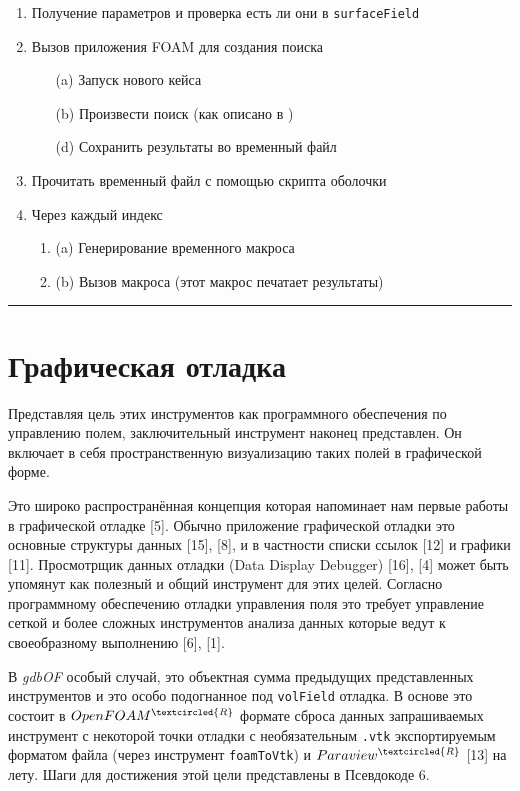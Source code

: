 \documentclass[a4paper,10pt]{book}
\begin{document}
{\begin{enumerate}
        \item Получение параметров и проверка есть ли они в \texttt{surfaceField}
	\item Вызов приложения FOAM для создания поиска
	\begin{enumerate}
		\item[(a)] Запуск нового кейса
		\item[(b)] Произвести поиск (как описано в )
		\item[(d)] Сохранить результаты во временный файл
	\end{enumerate}
	\item Прочитать временный файл с помощью скрипта оболочки
	\item Через каждый индекс
	\begin{enumerate}
		\item{(a)} Генерирование временного макроса
		\item{(b)} Вызов макроса (этот макрос печатает результаты)
	\end{enumerate}
        \end{enumerate}
} 

\vspace{2 mm}
\smallskip\hrule
\vspace{5 mm}

\section{Графическая отладка}
\label{sec:3.3}

Представляя цель этих инструментов как программного обеспечения по управлению полем, заключительный инструмент наконец представлен. Он
включает в себя пространственную визуализацию таких полей в графической форме.

Это широко распространённая концепция которая напоминает нам первые работы в графической отладке [5]. Обычно приложение графической отладки
это основные структуры данных [15], [8], и в частности списки ссылок [12] и графики [11]. Просмотрщик данных отладки (Data Display Debugger)
[16], [4] может быть упомянут как полезный и общий инструмент для этих целей. Согласно программному обеспечению отладки управления поля
это требует управление сеткой и более сложных инструментов анализа данных которые ведут к своеобразному выполнению [6], [1].

В \textit{gdbOF} особый случай, это объектная сумма предыдущих представленных инструментов и это особо подогнанное под \texttt{volField}
отладка. В основе это состоит в $OpenFOAM^{\tiny\textcircled{R}}$ формате сброса данных запрашиваемых инструмент с некоторой точки отладки
с необязательным \texttt{.vtk} экспортируемым форматом файла (через инструмент \texttt{foamToVtk}) и $Paraview^{\tiny\textcircled{R}}$ [13]
на лету. Шаги для достижения этой цели представлены в Псевдокоде 6.
\end{document}
